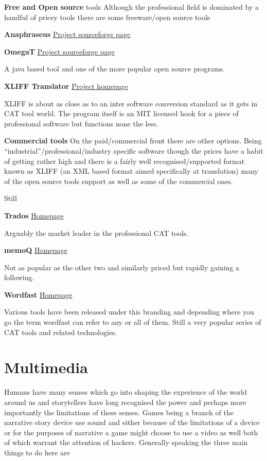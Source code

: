 \documentclass[
]{book}
\begin{document}
\textbf{Free and Open source} tools Although the professional field is dominated by a handful of pricey tools there are some freeware/open source tools

\textbf{Anaphraseus} \href{http://sourceforge.net/projects/anaphraseus/?source=recommended}{Project sourceforge page}

\textbf{OmegaT} \href{http://sourceforge.net/projects/omegat/?source=recommended}{Project sourceforge page}

A java based tool and one of the more popular open source programs.

\textbf{XLIFF Translator} \href{http://felix-cat.com/tools/xliff-translator/}{Project homepage}

XLIFF is about as close as to an inter software conversion standard as it gets in CAT tool world. The program itself is an MIT licensed hook for a piece of professional software but functions none the less.

\textbf{Commercial tools} On the paid/commercial front there are other options. Being ``industrial''/professional/industry specific software though the prices have a habit of getting rather high and there is a fairly well recognised/supported format known as XLIFF (an XML based format aimed specifically at translation) many of the open source tools support as well as some of the commercial ones.

Still

\textbf{Trados} \href{http://www.trados.com/en/freelance-translators/default.asp}{Homepage}

Arguably the market leader in the professional CAT tools.

\textbf{memoQ} \href{http://kilgray.com/products/memoq}{Homepage}

Not as popular as the other two and similarly priced but rapidly gaining a following.

\textbf{Wordfast} \href{http://www.wordfast.net/}{Homepage}

Various tools have been released under this branding and depending where you go the term wordfast can refer to any or all of them. Still a very popular series of CAT tools and related technologies.

\hypertarget{multimedia}{%
\chapter{Multimedia}\label{multimedia}}

Humans have many senses which go into shaping the experience of the world around us and storytellers have long recognised the power and perhaps more importantly the limitations of these senses. Games being a branch of the narrative story device use sound and either because of the limitations of a device or for the purposes of narrative a game might choose to use a video as well both of which warrant the attention of hackers. Generally speaking the three main things to do here are
\end{document}
